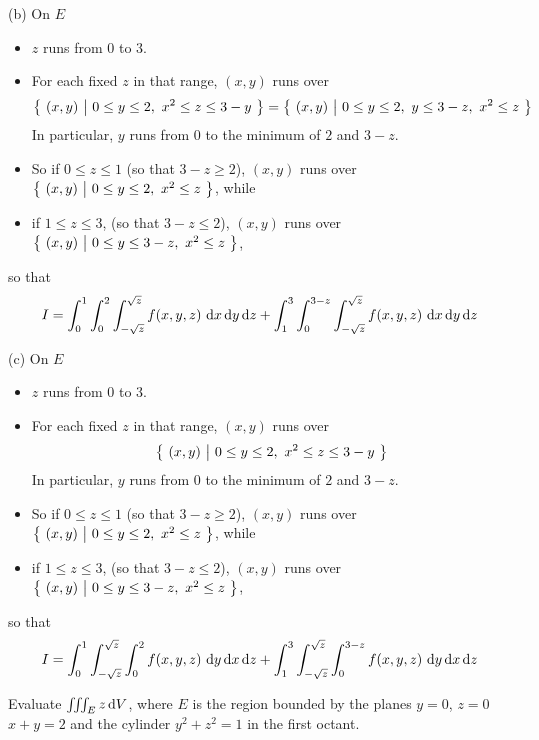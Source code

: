 \begin{solution}
(b) On $E$
\begin{itemize}
\item 
$z$ runs from $0$ to $3$.
\item
For each fixed $z$ in that range, $(x,y)$ runs over
\begin{equation*}
\big\{ \ (x,y)\ \big|\ 0\le y\le 2,\ x^2\le z\le 3-y\ \big\}
=\big\{ \ (x,y)\ \big|\ 0\le y\le 2,\ y\le 3-z,\ x^2\le z\ \big\}
\end{equation*}
In particular, $y$ runs from $0$ to the minimum of $2$ and $3-z$.
\item 
So if $0\le z\le 1$ (so that $3-z\ge 2$), 
$(x,y)$ runs over $\big\{ \ (x,y)\ \big|\ 0\le y\le 2,\ x^2\le z\ \big\}$, while
\item
if $1\le z\le 3$, 
(so that $3-z\le 2$), 
$(x,y)$ runs over $\big\{ \ (x,y)\ \big|\ 0\le y\le 3-z,\ x^2\le z\ \big\}$,
\end{itemize}
so that
\begin{align*}
I= \int_0^1 \int_0^2 \int_{-\sqrt{z}}^{\sqrt{z}} f(x,y,z)\    
                 \mathrm{d}x\,\mathrm{d}y\,\mathrm{d}z
+\int_1^3 \int_0^{3-z} \int_{-\sqrt{z}}^{\sqrt{z}} f(x,y,z)\    
                 \mathrm{d}x\,\mathrm{d}y\,\mathrm{d}z
\end{align*}

(c) On $E$
\begin{itemize}
\item 
$z$ runs from $0$ to $3$.
\item
For each fixed $z$ in that range, $(x,y)$ runs over
\begin{equation*}
\big\{ \ (x,y)\ \big|\ 0\le y\le 2,\ x^2\le z\le 3-y\ \big\}
\end{equation*}
In particular, $y$ runs from $0$ to the minimum of $2$ and $3-z$.
\item 
So if $0\le z\le 1$ (so that $3-z\ge 2$), 
$(x,y)$ runs over $\big\{ \ (x,y)\ \big|\ 0\le y\le 2,\ x^2\le z\ \big\}$, while
\item
if $1\le z\le 3$, 
(so that $3-z\le 2$), 
$(x,y)$ runs over $\big\{ \ (x,y)\ \big|\ 0\le y\le 3-z,\ x^2\le z\ \big\}$,
\end{itemize}
so that
\begin{align*}
I= \int_0^1  \int_{-\sqrt{z}}^{\sqrt{z}}\int_0^2 f(x,y,z)\    
                 \mathrm{d}y\,\mathrm{d}x\,\mathrm{d}z
+\int_1^3 \int_{-\sqrt{z}}^{\sqrt{z}}  \int_0^{3-z} f(x,y,z)\    
                 \mathrm{d}y\,\mathrm{d}x\,\mathrm{d}z
\end{align*}
\end{solution}

\begin{question}[M200 2002D] %
Evaluate $\iiint_E z\,\mathrm{d}V$, where $E$ is the region bounded
by the planes $y=0$, $z=0$ $x+y=2$ and the cylinder $y^2+z^2=1$ in the
first octant.
\end{question}

